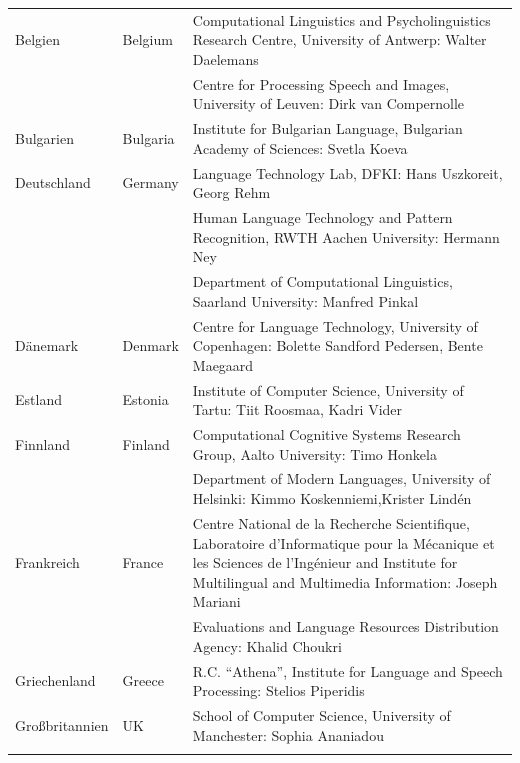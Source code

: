 \begin{longtable}{@{}llp{113mm}@{}}
  Belgien & \textcolor{grey1}{Belgium} & Computational Linguistics and Psycholinguistics Research Centre, University of Antwerp: Walter Daelemans\\ \addlinespace
  & & Centre for Processing Speech and Images, University of Leuven: Dirk van Compernolle \\ \addlinespace
  Bulgarien & \textcolor{grey1}{Bulgaria} & Institute for Bulgarian Language, Bulgarian Academy of Sciences: Svetla Koeva \\ \addlinespace
  Deutschland & \textcolor{grey1}{Germany} & Language Technology Lab, DFKI: Hans Uszkoreit, Georg Rehm\\ \addlinespace
  & & Human Language Technology and Pattern Recognition, RWTH Aachen University: Hermann Ney \\ \addlinespace
  & & Department of Computational Linguistics, Saarland University: Manfred Pinkal\\ \addlinespace Dänemark &  \textcolor{grey1}{Denmark} & Centre for Language Technology, University of Copenhagen: \newline Bolette Sandford Pedersen, Bente Maegaard\\ \addlinespace
  Estland & \textcolor{grey1}{Estonia} & Institute of Computer Science, University of Tartu: Tiit Roosmaa, Kadri Vider\\ \addlinespace
  Finnland & \textcolor{grey1}{Finland} & Computational Cognitive Systems Research Group, Aalto University: Timo Honkela\\ \addlinespace
  & & Department of Modern Languages, University of Helsinki: Kimmo Koskenniemi,\newline Krister Lindén \\ \addlinespace
  Frankreich & \textcolor{grey1}{France} & Centre National de la Recherche Scientifique, Laboratoire d'Informatique pour la Mécanique et les Sciences de l'Ingénieur and Institute for Multilingual and Multimedia Information: Joseph Mariani \\ \addlinespace
  & & Evaluations and Language Resources Distribution Agency: Khalid Choukri\\ \addlinespace 
  Griechenland & \textcolor{grey1}{Greece} & R.C. “Athena”, Institute for Language and Speech Processing: Stelios Piperidis\\ \addlinespace
  Großbritannien & \textcolor{grey1}{UK} & 
  School of Computer Science, University of Manchester: Sophia Ananiadou \\ \addlinespace 

\end{longtable}

